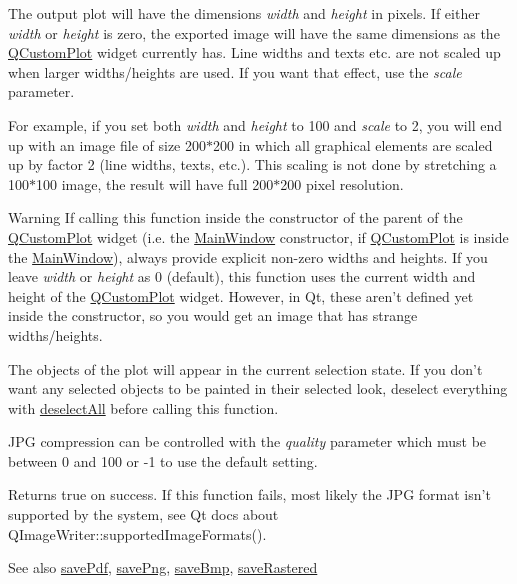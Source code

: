 The output plot will have the dimensions {\itshape width} and {\itshape height} in pixels. If either {\itshape width} or {\itshape height} is zero, the exported image will have the same dimensions as the \hyperlink{a00030_d8/d00/a00186}{Q\+Custom\+Plot} widget currently has. Line widths and texts etc. are not scaled up when larger widths/heights are used. If you want that effect, use the {\itshape scale} parameter.

For example, if you set both {\itshape width} and {\itshape height} to 100 and {\itshape scale} to 2, you will end up with an image file of size 200$\ast$200 in which all graphical elements are scaled up by factor 2 (line widths, texts, etc.). This scaling is not done by stretching a 100$\ast$100 image, the result will have full 200$\ast$200 pixel resolution.

\begin{DoxyWarning}{Warning}
If calling this function inside the constructor of the parent of the \hyperlink{a00030_d8/d00/a00186}{Q\+Custom\+Plot} widget (i.\+e. the \hyperlink{a00017}{Main\+Window} constructor, if \hyperlink{a00030_d8/d00/a00186}{Q\+Custom\+Plot} is inside the \hyperlink{a00017}{Main\+Window}), always provide explicit non-\/zero widths and heights. If you leave {\itshape width} or {\itshape height} as 0 (default), this function uses the current width and height of the \hyperlink{a00030_d8/d00/a00186}{Q\+Custom\+Plot} widget. However, in Qt, these aren't defined yet inside the constructor, so you would get an image that has strange widths/heights.
\end{DoxyWarning}
The objects of the plot will appear in the current selection state. If you don't want any selected objects to be painted in their selected look, deselect everything with \hyperlink{a00116_a9d4808ab925b003054085246c92a257c}{deselect\+All} before calling this function.

J\+P\+G compression can be controlled with the {\itshape quality} parameter which must be between 0 and 100 or -\/1 to use the default setting.

Returns true on success. If this function fails, most likely the J\+P\+G format isn't supported by the system, see Qt docs about Q\+Image\+Writer\+::supported\+Image\+Formats().

\begin{DoxySeeAlso}{See also}
\hyperlink{a00116_a84e33ad7492180f20ff520e557ed102d}{save\+Pdf}, \hyperlink{a00116_a7636261aff1f6d25c9da749ece3fc8b8}{save\+Png}, \hyperlink{a00116_a6629d9e8e6da4bf18055ee0257fdce9a}{save\+Bmp}, \hyperlink{a00116_ab528b84cf92baabe29b1d0ef2f77c93e}{save\+Rastered} 
\end{DoxySeeAlso}


